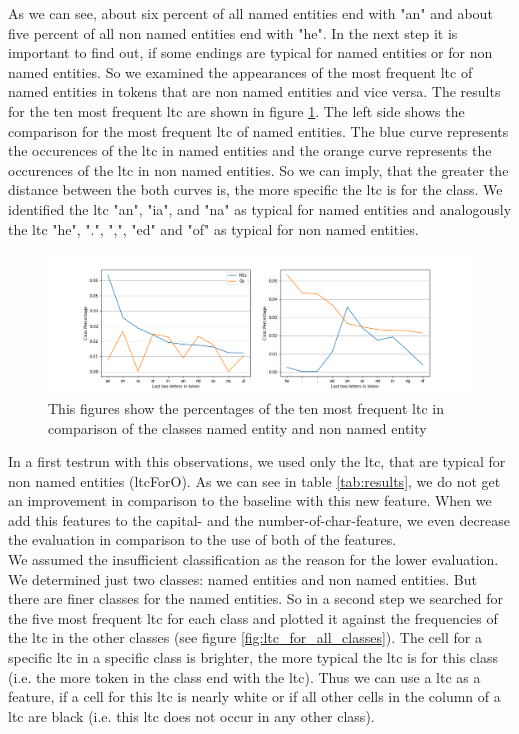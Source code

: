 \documentclass[noindent, nochapname]{tudexercise}
\begin{document}
			As we can see, about six percent of all named entities end with "an" and about five percent of all non named entities end with "he". In the next step it is important to find out, if some endings are typical for named entities or for non named entities. So we examined the appearances of the most frequent ltc of named entities in tokens that are non named entities and vice versa. The results for the ten most frequent ltc are shown in figure \ref{fig:ten_most_frequent_comparison}. The left side shows the comparison for the most frequent ltc of named entities. The blue curve represents the occurences of the ltc in named entities and the orange curve represents the occurences of the ltc in non named entities. So we can imply, that the greater the distance between the both curves is, the more specific the ltc is for the class. We identified the ltc "an", "ia", and "na" as typical for named entities and analogously the ltc "he", ".", ",", "ed" and "of" as typical for non named entities.\\
			
			\begin{figure}[h]
				\centering
				\includegraphics[scale=0.5]{img/last_two_letters_comparison.png}
				\caption{This figures show the percentages of the ten most frequent ltc in comparison of the classes named entity and non named entity}
				\label{fig:ten_most_frequent_comparison}
			\end{figure}
						
			In a first testrun with this observations, we used only the ltc, that are typical for non named entities (ltcForO). As we can see in table \ref{tab:results}, we do not get an improvement in comparison to the baseline with this new feature. When we add this features to the capital- and the number-of-char-feature, we even decrease the evaluation in comparison to the use of both of the features.\\
			
			We assumed the insufficient classification as the reason for the lower evaluation. We determined just two classes: named entities and non named entities. But there are finer classes for the named entities. So in a second step we searched for the five most frequent ltc for each class and plotted it against the frequencies of the ltc in the other classes (see figure \ref{fig:ltc_for_all_classes}). The cell for a specific ltc in a specific class is brighter, the more typical the ltc is for this class (i.e. the more token in the class end with the ltc). Thus we can use a ltc as a feature, if a cell for this ltc is nearly white or if all other cells in the column of a ltc are black (i.e. this ltc does not occur in any other class).
			
\end{document}
